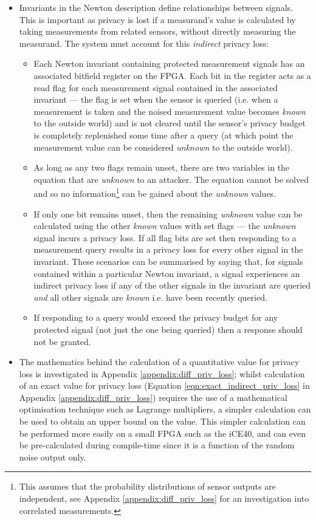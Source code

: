 \documentclass[12pt]{article}
\begin{document}
\begin{itemize}
      \item Invariants in the Newton description define relationships between signals. This is important as privacy is lost if a measurand's value is calculated by taking measurements from related sensors, without directly measuring the measurand. The system must account for this \textit{indirect} privacy loss:
      \begin{itemize}
        \item Each Newton invariant containing protected measurement signals has an associated bitfield register on the FPGA. Each bit in the register acts as a read flag for each measurement signal contained in the associated invariant --- the flag is set when the sensor is queried (i.e. when a measurement is taken and the noised measurement value becomes \textit{known} to the outside world) and is not cleared until the sensor's privacy budget is completely replenished some time after a query (at which point the measurement value can be considered \textit{unknown} to the outside world).
        \item As long as any two flags remain unset, there are two variables in the equation that are \textit{unknown} to an attacker. The equation cannot be solved and so no information\footnote{This assumes that the probability distributions of sensor outputs are independent, see Appendix \ref{appendix:diff_priv_loss} for an investigation into correlated measurements.} can be gained about the \textit{unknown} values.
        \item If only one bit remains unset, then the remaining \textit{unknown} value can be calculated using the other \textit{known} values with set flags --- the \textit{unknown} signal incurs a privacy loss. If all flag bits are set then responding to a measurement query results in a privacy loss for every other signal in the invariant. These scenarios can be summarised by saying that, for signals contained within a particular Newton invariant, a signal experiences an indirect privacy loss if any of the other signals in the invariant are queried \textit{and} all other signals are \textit{known} i.e. have been recently queried.
        \item If responding to a query would exceed the privacy budget for any protected signal (not just the one being queried) then a response should not be granted.
      \end{itemize}
      \item The mathematics behind the calculation of a quantitative value for privacy loss is investigated in Appendix \ref{appendix:diff_priv_loss}; whilst calculation of an exact value for privacy loss (Equation \ref{eqn:exact_indirect_priv_loss} in Appendix \ref{appendix:diff_priv_loss}) requires the use of a mathematical optimisation technique such as Lagrange multipliers, a simpler calculation can be used to obtain an upper bound on the value. This simpler calculation can be performed more easily on a small FPGA such as the iCE40, and can even be pre-calculated during compile-time since it is a function of the random noise output only.

    \end{itemize}
\end{document}
